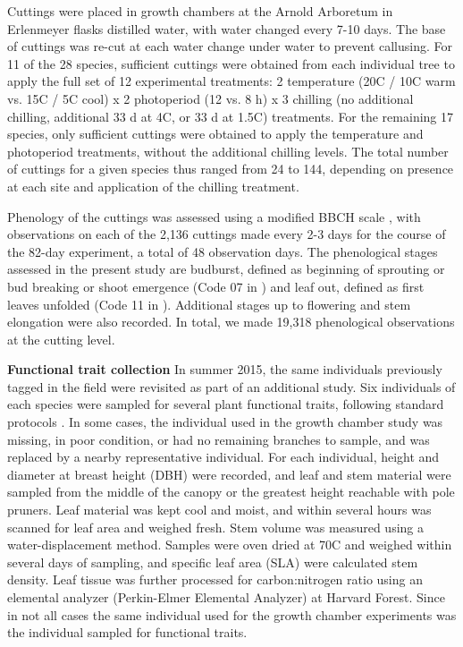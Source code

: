 \documentclass[11pt]{article}
\begin{document}
Cuttings were placed in growth chambers at the Arnold Arboretum in Erlenmeyer flasks distilled water, with water changed every 7-10 days. The base of cuttings was re-cut at each water change under water to prevent callusing. For 11 of the 28 species, sufficient cuttings were obtained from each individual tree to apply the full set of 12 experimental treatments: 2 temperature (20\degree C / 10\degree C warm vs. 15\degree C / 5\degree C cool) x 2 photoperiod (12 vs. 8 h) x 3 chilling (no additional chilling,  additional 33 d at 4\degree C, or 33 d at 1.5\degree C) treatments. For the remaining 17 species, only sufficient cuttings were obtained to apply the temperature and photoperiod treatments, without the additional chilling levels. The total number of cuttings for a given species thus ranged from 24 to 144, depending on presence at each site and application of the chilling treatment.

Phenology of the cuttings was assessed using a modified BBCH scale \cite{Finn:2007}, with observations on each of the 2,136 cuttings made every 2-3 days for the course of the 82-day experiment, a total of 48 observation days. The phenological stages assessed in the present study are budburst, defined as beginning of sprouting or bud breaking or shoot emergence (Code 07 in \cite{Finn:2007}) and leaf out, defined as first leaves unfolded (Code 11 in \cite{Finn:2007}). Additional stages up to flowering and stem elongation were also recorded. In total, we made 19,318 phenological observations at the cutting level.

\textbf{Functional trait collection}
In summer 2015, the same individuals previously tagged in the field were revisited as part of an additional study. Six individuals of each species were sampled for several plant functional traits, following standard protocols \cite{Perez-Harguindeguy:2013aa}. In some cases, the individual used in the growth chamber study was missing, in poor condition, or had no remaining branches to sample, and was replaced by a nearby representative individual. For each individual, height and diameter at breast height (DBH) were recorded, and leaf and stem material were sampled from the middle of the canopy or the greatest height reachable with pole pruners. Leaf material was kept cool and moist, and within several hours was scanned for leaf area and weighed fresh. Stem volume was measured using a water-displacement method. Samples were oven dried at 70\degree C and weighed within several days of sampling, and specific leaf area (SLA) were calculated stem density. Leaf tissue was further processed for carbon:nitrogen ratio using an elemental analyzer (Perkin-Elmer Elemental Analyzer) at Harvard Forest. Since in not all cases the same individual used for the growth chamber experiments was the individual sampled for functional traits.
\end{document}
